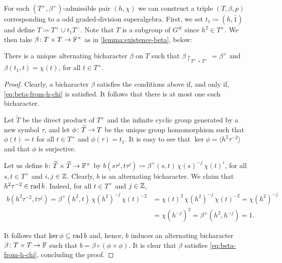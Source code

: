 For each $(T^+, \beta^+)$-admissible pair $(h, \chi)$ we can construct a triple $(T, \beta, p)$ corresponding to a odd graded-division superalgebra. 
First, we set $t_1 \coloneqq (h, \bar 1)$ and define $T \coloneqq T^+ \cup t_1 T^-$. 
Note that $T$ is a subgroup of $G^\#$ since $h^2 \in T^+$. 
We then take $\beta\colon T\times T \to \mathbb{F}^\times$ as in \cref{lemma:existence-beta}, below:

\begin{lemma}\label{lemma:existence-beta}
    There is a unique alternating bicharacter $\beta$ on $T$ such that $\beta\restriction_{T^+ \times T^+} = \beta^+$ and $\beta(t_1, t) = \chi(t)$, for all $t\in T^+$.
\end{lemma}

\begin{proof}
    Clearly, a bicharacter $\beta$ satisfies the conditions above if, and only if, \cref{eq:beta-from-h-chi} is satisfied. 
    It follows that there is at most one such bicharacter. 
    
    
    Let $\widetilde T$ be the direct product of $T^+$ and the infinite cyclic group generated by a new symbol $\tau$, and let $\phi \colon \widetilde T \to T$ be the unique group homomorphism such that $\phi(t) = t$ for all $t\in T^+$ and $\phi(\tau) = t_1$. 
    It is easy to see that $\ker \phi = \langle h^2 \tau^{-2} \rangle$ and that $\phi$ is surjective. 
    
    Let us define $b\colon \widetilde T\times \widetilde T \rightarrow \mathbb{F}^\times$ by $b(s\tau^i,t\tau^j) \coloneqq \beta^+(s,t)\, \chi (s)^{-j}\, \chi (t)^i$, for all $s,t\in T^+$ and $i,j \in \mathbb{Z}$. 
    Clearly, $b$ is an alternating bicharacter. 
    We claim that $h^2 \tau^{-2} \in \operatorname{rad} b$. 
    Indeed, for all $t \in T^+$ and $j \in \mathbb{Z}$,
    \begin{align}
        b(h^2 \tau^{-2},t\tau^j) = \beta^+(h^2,t)\, \chi (h^2)^{-j}\, \chi (t)^{-2} &= \chi (t)^{2}\, \chi (h^2)^{-j}\, \chi (t)^{-2} = \chi (h^2)^{-j} \\
        &= \chi (h^{-j})^2 = \beta^+(h^2,h^{-j}) = 1.
    \end{align}
    
    It follows that $\ker \phi \subseteq \operatorname{rad} b$ and, hence, $b$ induces an alternating bicharacter $\beta\colon T\times T \to \mathbb{F}$ such that $b = \beta \circ (\phi \times \phi)$. 
    It is clear that $\beta$ satisfies \cref{eq:beta-from-h-chi}, concluding the proof.
\end{proof}

